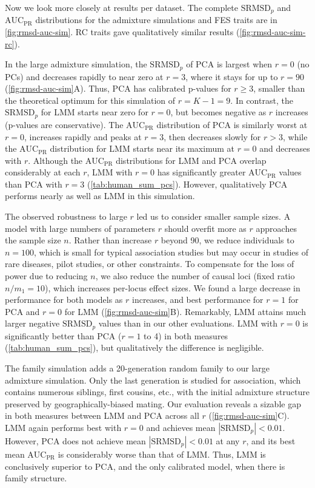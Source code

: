 \documentclass[11pt]{article}
\newcommand{\rmsd}{\text{SRMSD}_p}
\newcommand{\auc}{\text{AUC}_\text{PR}}
\begin{document}
\begin{linenumbers}
Now we look more closely at results per dataset.
The complete $\rmsd$ and $\auc$ distributions for the admixture simulations and FES traits are in \cref{fig:rmsd-auc-sim}.
RC traits gave qualitatively similar results (\cref{fig:rmsd-auc-sim-rc}).

In the large admixture simulation, the $\rmsd$ of PCA is largest when $r=0$ (no PCs) and decreases rapidly to near zero at $r=3$, where it stays for up to $r=90$ (\cref{fig:rmsd-auc-sim}A).
Thus, PCA has calibrated p-values for $r \ge 3$, smaller than the theoretical optimum for this simulation of $r = K - 1 = 9$.
In contrast, the $\rmsd$ for LMM starts near zero for $r=0$, but becomes negative as $r$ increases (p-values are conservative).
The $\auc$ distribution of PCA is similarly worst at $r=0$, increases rapidly and peaks at $r = 3$, then decreases slowly for $r > 3$, while the $\auc$ distribution for LMM starts near its maximum at $r=0$ and decreases with $r$.
Although the $\auc$ distributions for LMM and PCA overlap considerably at each $r$, LMM with $r=0$ has significantly greater $\auc$ values than PCA with $r=3$ (\cref{tab:human_sum_pcs}).
However, qualitatively PCA performs nearly as well as LMM in this simulation.

The observed robustness to large $r$ led us to consider smaller sample sizes.
A model with large numbers of parameters $r$ should overfit more as $r$ approaches the sample size $n$.
Rather than increase $r$ beyond 90, we reduce individuals to $n = 100$, which is small for typical association studies but may occur in studies of rare diseases, pilot studies, or other constraints.
To compensate for the loss of power due to reducing $n$, we also reduce the number of causal loci (fixed ratio $n / m_1 = 10$), which increases per-locus effect sizes.
We found a large decrease in performance for both models as $r$ increases, and best performance for $r=1$ for PCA and $r=0$ for LMM (\cref{fig:rmsd-auc-sim}B).
Remarkably, LMM attains much larger negative $\rmsd$ values than in our other evaluations.
LMM with $r=0$ is significantly better than PCA ($r=1$ to 4) in both measures (\cref{tab:human_sum_pcs}), but qualitatively the difference is negligible.

The family simulation adds a 20-generation random family to our large admixture simulation.
Only the last generation is studied for association, which contains numerous siblings, first cousins, etc., with the initial admixture structure preserved by geographically-biased mating.
Our evaluation reveals a sizable gap in both measures between LMM and PCA across all $r$ (\cref{fig:rmsd-auc-sim}C).
LMM again performs best with $r=0$ and achieves mean $|\rmsd| < 0.01$.
However, PCA does not achieve mean $|\rmsd| < 0.01$ at any $r$, and its best mean $\auc$ is considerably worse than that of LMM.
Thus, LMM is conclusively superior to PCA, and the only calibrated model, when there is family structure.


\end{linenumbers}
\end{document}
